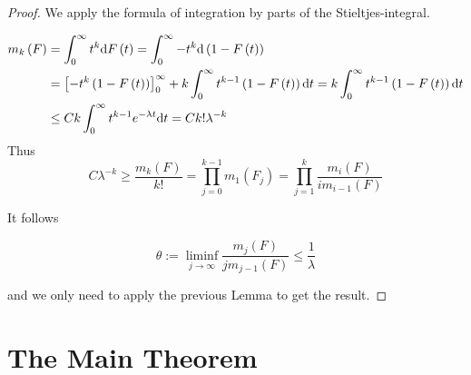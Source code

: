 \documentclass[12pt,a4paper]{scrartcl}
\numberwithin{equation}{section}
\begin{document}
\begin{proof}
We apply the formula of integration by parts of the Stieltjes-integral.

\begin{align*}
m_k\left(F\right) &= \int_0^{\infty} t^k \textnormal{d}F\left(t\right) = \int_0^{\infty} -t^k \textnormal{d}\left(1-F\left(t\right)\right) \\
&= \left[-t^k\left(1-F\left(t\right)\right)\right]_0^{\infty} + k\int_0^{\infty} t^{k-1}\left(1-F\left(t\right)\right) \textnormal{d}t = k\int_0^{\infty} t^{k-1}\left(1-F\left(t\right)\right) \textnormal{d}t \\
& \leq C k \int_0^{\infty} t^{k-1} e^{-\lambda t} \textnormal{d}t = Ck!\lambda^{-k} 
\end{align*}
Thus
\begin{equation*}
C\lambda^{-k} \geq \frac{m_k\left(F\right)}{k!} =\prod_{j=0}^{k-1} m_1\left(F_j\right) =\prod_{j=1}^{k} \frac{m_i\left(F\right)}{im_{i-1}\left(F\right)}
\end{equation*}

It follows

\begin{equation}
\theta := \liminf_{j \to \infty} \frac{m_j\left(F\right)}{j m_{j-1}\left(F\right)} \leq \frac{1}{\lambda} 
\end{equation}

and we only need to apply the previous Lemma to get the result.
\end{proof}



\newpage
\section{The Main Theorem}
\end{document}

